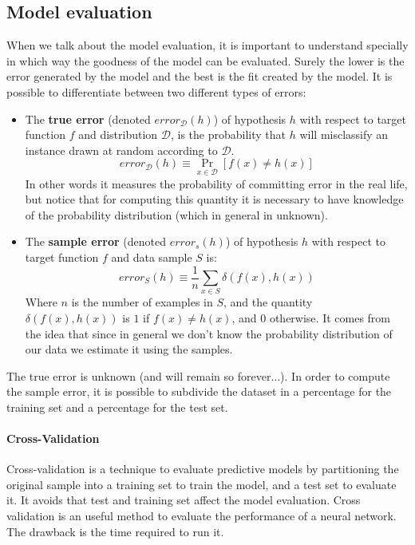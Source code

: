 \subsection{Model evaluation}
When we talk about the model evaluation, it is important to understand specially in which way the goodness of the model can be evaluated. Surely the lower is the error generated by the model and the best is the fit created by the model. It is possible to differentiate between two different types of errors:
\begin{itemize}
	\item The \textbf{true error} (denoted $error_{\mathcal{D}}(h)$) of hypothesis $h$ with respect to target function $f$ and distribution $\mathcal{D}$, is the probability that $h$ will misclassify an instance drawn at random according to $\mathcal{D}$.
	$$error_{\mathcal{D}}(h) \equiv \operatorname{Pr}_{x \in \mathcal{D}} \left[f(x) \neq h(x)\right]$$ 
	In other words it measures the probability of committing error in the real life, but notice that for computing this quantity it is necessary to have knowledge of the probability distribution (which in general in unknown).
	
	\item The \textbf{sample error} (denoted $error_{s}(h)$) of hypothesis $h$ with respect to target function $f$ and data sample $S$ is:
	$$error_{S}(h) \equiv \frac{1}{n} \sum_{x \in S} \delta (f(x) , h(x))$$ 
	Where $n$ is the number of examples in $S$, and the quantity $\delta(f(x), h(x))$ is $1$ if $f(x) \neq h(x)$, and $0$ otherwise. It comes from the idea that since in general we don't know the probability distribution of our data we estimate it using the samples.
\end{itemize}
The true error is unknown (and will remain so forever$\dots$). In order to compute the sample error, it is possible to subdivide the dataset in a percentage for the training set and a percentage for the test set.
\paragraph{Cross-Validation} Cross-validation is a technique to evaluate predictive models by partitioning the original sample into a training set to train the model, and a test set to evaluate it. It avoids that test and training set affect the model evaluation. 
Cross validation is an useful method to evaluate the performance of a neural network. The drawback is the time required to run it.

